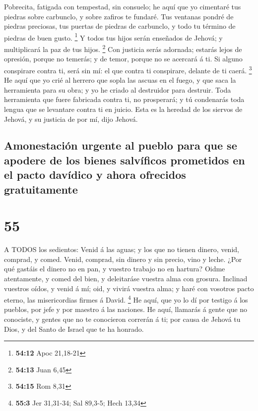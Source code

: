 Pobrecita, fatigada con tempestad, sin consuelo; he aquí
que yo cimentaré tus piedras sobre carbunclo, y sobre zafiros te
fundaré.  Tus ventanas pondré de piedras preciosas, tus
puertas de piedras de carbunclo, y todo tu término de piedras de buen
gusto. \footnote{\textbf{54:12} Apoc 21,18-21}  Y todos tus
hijos serán enseñados de Jehová; y multiplicará la paz de tus hijos.
\footnote{\textbf{54:13} Juan 6,45}  Con justicia serás
adornada; estarás lejos de opresión, porque no temerás; y de temor,
porque no se acercará á ti.  Si alguno conspirare contra
ti, será sin mí: el que contra ti conspirare, delante de ti caerá.
\footnote{\textbf{54:15} Rom 8,31}  He aquí que yo crié al
herrero que sopla las ascuas en el fuego, y que saca la herramienta para
su obra; y yo he criado al destruidor para destruir.  Toda
herramienta que fuere fabricada contra ti, no prosperará; y tú
condenarás toda lengua que se levantare contra ti en juicio. Esta es la
heredad de los siervos de Jehová, y su justicia de por mí, dijo Jehová.

\hypertarget{amonestaciuxf3n-urgente-al-pueblo-para-que-se-apodere-de-los-bienes-salvuxedficos-prometidos-en-el-pacto-davuxeddico-y-ahora-ofrecidos-gratuitamente}{%
\subsection{Amonestación urgente al pueblo para que se apodere de los
bienes salvíficos prometidos en el pacto davídico y ahora ofrecidos
gratuitamente}\label{amonestaciuxf3n-urgente-al-pueblo-para-que-se-apodere-de-los-bienes-salvuxedficos-prometidos-en-el-pacto-davuxeddico-y-ahora-ofrecidos-gratuitamente}}

\hypertarget{section-54}{%
\section{55}\label{section-54}}

 A TODOS los sedientos: Venid á las aguas; y los que no
tienen dinero, venid, comprad, y comed. Venid, comprad, sin dinero y sin
precio, vino y leche.  ¿Por qué gastáis el dinero no en pan,
y vuestro trabajo no en hartura? Oidme atentamente, y comed del bien, y
deleitaráse vuestra alma con grosura.  Inclinad vuestros
oídos, y venid á mí; oid, y vivirá vuestra alma; y haré con vosotros
pacto eterno, las misericordias firmes á David. \footnote{\textbf{55:3}
  Jer 31,31-34; Sal 89,3-5; Hech 13,34}  He aquí, que yo lo
dí por testigo á los pueblos, por jefe y por maestro á las naciones.
 He aquí, llamarás á gente que no conociste, y gentes que no
te conocieron correrán á ti; por causa de Jehová tu Dios, y del Santo de
Israel que te ha honrado.

